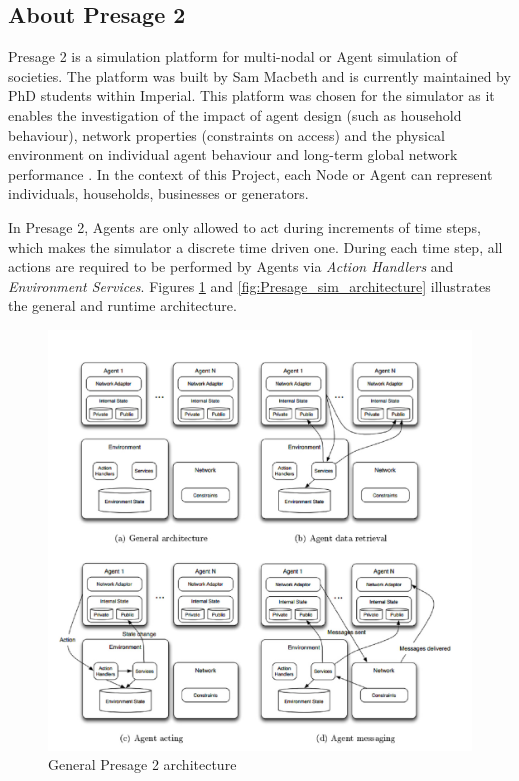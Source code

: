 \subsection*{About Presage 2}
Presage 2 is a simulation platform for multi-nodal or Agent simulation of societies. The platform was built by Sam Macbeth and is currently maintained by PhD students within Imperial. This platform was chosen for the simulator as it enables the investigation of the impact of agent design (such as household behaviour), network properties (constraints on access) and the physical environment on individual agent behaviour and long-term global network performance \cite{Presage2-Desc:2015}. In the context of this Project, each Node or Agent can represent individuals, households, businesses or generators. 

In Presage 2, Agents are only allowed to act during increments of time steps, which makes the simulator a discrete time driven one. During each time step, all actions are required to be performed by Agents via \textit{Action Handlers} and \textit{Environment Services}. Figures \ref{fig:Presage_architecture} and \ref{fig:Presage_sim_architecture} illustrates the general and runtime architecture.

\begin{figure}[h!]
	\centering
	\includegraphics[scale=0.25]{Images/Presage.jpg}
	\caption{General Presage 2 architecture \cite{Presage_Kyoto:2015}}
	\label{fig:Presage_architecture}
\end{figure}

